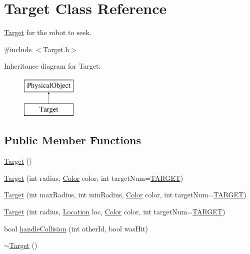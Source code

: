 \hypertarget{classTarget}{\section{Target Class Reference}
\label{classTarget}
}


\hyperlink{classTarget}{Target} for the robot to seek.  




{\ttfamily \#include $<$Target.\-h$>$}

Inheritance diagram for Target\-:\begin{figure}[H]
\begin{center}
\leavevmode
\includegraphics[height=2.000000cm]{classTarget}
\end{center}
\end{figure}
\subsection*{Public Member Functions}
\begin{DoxyCompactItemize}
\item 
\hyperlink{classTarget_a7008d6752ce64f82e56aae6ea6c2bb65}{Target} ()
\item 
\hyperlink{classTarget_a21429bfdca0f6c969f3a65792d56ac76}{Target} (int radius, \hyperlink{structColor}{Color} color, int target\-Num=\hyperlink{PhysicalObject_8h_a842c5e2e69277690b064bf363c017980a09aa9e75617e9d8719738ca163c09137}{T\-A\-R\-G\-E\-T})
\item 
\hyperlink{classTarget_a13cc903b7de80d6a7cfb9d7f3d3a8731}{Target} (int max\-Radius, int min\-Radius, \hyperlink{structColor}{Color} color, int target\-Num=\hyperlink{PhysicalObject_8h_a842c5e2e69277690b064bf363c017980a09aa9e75617e9d8719738ca163c09137}{T\-A\-R\-G\-E\-T})
\item 
\hyperlink{classTarget_a727a453692ead8379b7fc8befe60323e}{Target} (int radius, \hyperlink{structLocation}{Location} loc, \hyperlink{structColor}{Color} color, int target\-Num=\hyperlink{PhysicalObject_8h_a842c5e2e69277690b064bf363c017980a09aa9e75617e9d8719738ca163c09137}{T\-A\-R\-G\-E\-T})
\item 
bool \hyperlink{classTarget_a04dcb816902d80f21c83ed65d44c7bed}{handle\-Collision} (int other\-Id, bool was\-Hit)
\item 
\hyperlink{classTarget_a18102a6c58a268fb1466771463fdc9b3}{$\sim$\-Target} ()
\end{DoxyCompactItemize}
